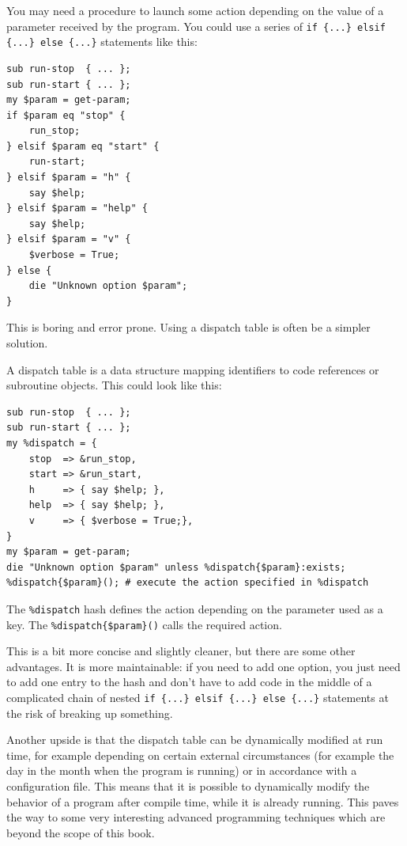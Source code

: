 You may 
need a procedure to launch some action depending on the 
value of a parameter received by the program. You could 
use a series of \verb'if {...} elsif {...} else {...}' 
statements like this:

\begin{verbatim}
sub run-stop  { ... };
sub run-start { ... };
my $param = get-param;
if $param eq "stop" {
    run_stop;
} elsif $param eq "start" {
    run-start;
} elsif $param = "h" {
    say $help;
} elsif $param = "help" {
    say $help;
} elsif $param = "v" {
    $verbose = True;
} else {
    die "Unknown option $param";
}
\end{verbatim}

This is boring and error prone. Using a dispatch table is often 
be a simpler solution.

A dispatch table is a data structure mapping identifiers to 
code references or subroutine objects. This could look like 
this:

\begin{verbatim}
sub run-stop  { ... };
sub run-start { ... };
my %dispatch = {
    stop  => &run_stop,
    start => &run_start,
    h     => { say $help; },
    help  => { say $help; },
    v     => { $verbose = True;},
}
my $param = get-param;
die "Unknown option $param" unless %dispatch{$param}:exists;
%dispatch{$param}(); # execute the action specified in %dispatch
\end{verbatim}

The \verb'%dispatch' hash defines the action depending on 
the parameter used as a key. The \verb'%dispatch{$param}()' 
calls the required action.

This is a bit more concise and slightly cleaner, but there are some other advantages. It is more maintainable: if you need 
to add one option, you just need to add one entry to the hash 
and don't have to add code in the middle of a complicated 
chain of nested \verb'if {...} elsif {...} else {...}' 
statements at the risk of breaking up something. 

Another upside is that the dispatch table can be dynamically 
modified at run time, for example depending on certain 
external circumstances (for example the day in the month when 
the program is running) or in accordance with a configuration 
file. This means that it is possible to dynamically modify 
the behavior of a program after compile time, while it is 
already running. This paves the way to some very interesting 
advanced programming techniques which are beyond the scope 
of this book.

